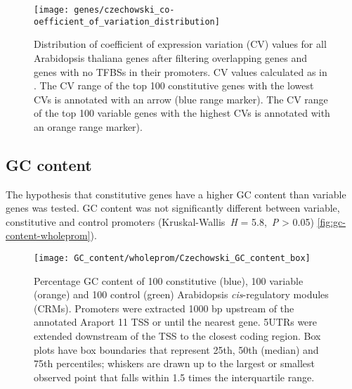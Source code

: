 \documentclass[../main.tex]{subfiles}
\begin{document}
\begin{figure}[hbt!]
	\begin{center}
		\capstart
		\texttt{[image: genes/czechowski\_co-oefficient\_of\_variation\_distribution]}
		\caption{
			Distribution of coefficient of expression variation (CV) values for all Arabidopsis thaliana genes after filtering overlapping genes and genes with no TFBSs in their promoters.
			CV values calculated as in \textcite{czechowskiGenomeWideIdentificationTesting2005}.
			The CV range of the top 100 constitutive genes with the lowest CVs is annotated with an arrow (blue range marker).
			The CV range of the top 100 variable genes with the highest CVs is annotated with an orange range marker).			
			\label{fig:cv-dist-allgenes}
		}
	\end{center}
\end{figure}

\subsection{GC content}

The hypothesis that constitutive genes have a higher GC content than variable genes was tested.
GC content was not significantly different between variable, constitutive and control promoters (Kruskal\hyp{}Wallis~\textit{H} = 5.8,~\textit{P} \textgreater{} 0.05) \autoref{fig:gc-content-wholeprom}).

\begin{figure}[hbt!]
	\begin{center}
		\capstart
		\texttt{[image: GC\_content/wholeprom/Czechowski\_GC\_content\_box]}
		\caption{
			Percentage GC content of 100 constitutive (blue), 100 variable (orange) and 100 control (green) Arabidopsis \textit{cis}\hyp{}regulatory modules (CRMs).
			Promoters were extracted 1000 bp upstream of the annotated Araport 11 \autocite{chengAraport11CompleteReannotation2017} TSS or until the nearest gene.
			5UTRs were extended downstream of the TSS to the closest coding region.  Box plots have box boundaries that represent 25th, 50th (median) and 75th percentiles; whiskers are drawn up to the largest or smallest observed point that falls within 1.5 times the interquartile range.
			\label{fig:gc-content-wholeprom}
		}
	\end{center}
\end{figure}
\end{document}

